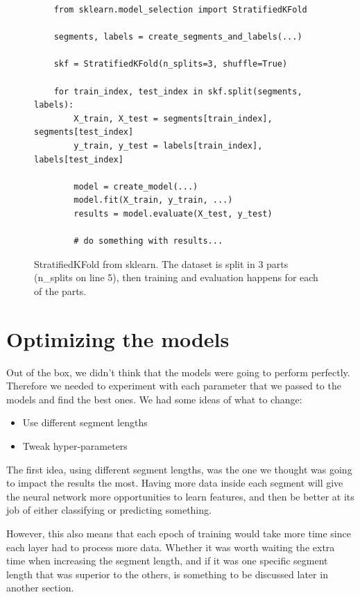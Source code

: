\begin{figure}
\begin{code}    
    \begin{verbatim}
    from sklearn.model_selection import StratifiedKFold

    segments, labels = create_segments_and_labels(...)

    skf = StratifiedKFold(n_splits=3, shuffle=True)

    for train_index, test_index in skf.split(segments, labels):
        X_train, X_test = segments[train_index], segments[test_index]
        y_train, y_test = labels[train_index], labels[test_index]

        model = create_model(...)
        model.fit(X_train, y_train, ...)
        results = model.evaluate(X_test, y_test)

        # do something with results...

    \end{verbatim}
    \caption{StratifiedKFold from sklearn. The dataset is split in 3 parts (n\_splits on line 5), then training and evaluation happens for each of the parts.}
    \label{code:sklearn_k_fold}
\end{code}
\end{figure}

\section{Optimizing the models}

\noindent Out of the box, we didn't think that the models were going to perform perfectly. Therefore we needed to experiment with each parameter that we passed to the models and find the best ones. We had some ideas of what to change:

\begin{itemize}
    \item Use different segment lengths
    \item Tweak hyper-parameters
\end{itemize}

\noindent The first idea, using different segment lengths, was the one we thought was going to impact the results the most. Having more data inside each segment will give the neural network more opportunities to learn features, and then be better at its job of either classifying or predicting something. 

However, this also means that each epoch of training would take more time since each layer had to process more data. Whether it was worth waiting the extra time when increasing the segment length, and if it was one specific segment length that was superior to the others, is something to be discussed later in another section. 

